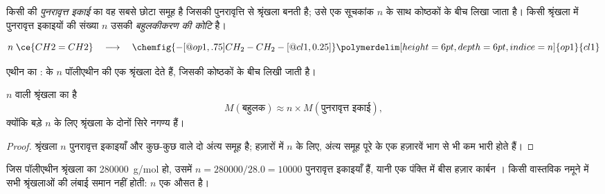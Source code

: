 \begin{definition}[पुनरावृत्त इकाई, बहुलकीकरण की कोटि]\label{def:g12:polymers:repeat-unit}
किसी  की \emph{पुनरावृत्त इकाई}  का वह सबसे छोटा
समूह है जिसकी पुनरावृत्ति से श्रृंखला बनती है; उसे एक सूचकांक $n$ के साथ
कोष्ठकों के बीच लिखा जाता है। किसी श्रृंखला में पुनरावृत्त इकाइयों की संख्या $n$
उसकी \emph{बहुलकीकरण की कोटि} है।
\end{definition}

\begin{omfigure}
\[
  n\;\ce{CH2=CH2}
  \quad\longrightarrow\quad
  \chemfig{-[@{op1,.75}]CH_2-CH_2-[@{cl1,0.25}]}
  \polymerdelim[height=6pt, depth=6pt, indice=n]{op1}{cl1}
\]

{\small एथीन का :  के $n$  पॉलीएथीन की एक
श्रृंखला देते हैं, जिसकी   कोष्ठकों के बीच
लिखी जाती है।}
\end{omfigure}

\begin{proposition}[बहुलक का मोलर द्रव्यमान]\label{prop:g12:polymers:molar-mass}
 $n$ वाली श्रृंखला का  है
\[
  M(\text{बहुलक}) \approx n \times M(\text{पुनरावृत्त इकाई}) ,
\]
क्योंकि बड़े $n$ के लिए श्रृंखला के दोनों सिरे नगण्य हैं।
\end{proposition}

\begin{proof}
श्रृंखला $n$ पुनरावृत्त इकाइयाँ और कुछ-कुछ  वाले दो अंत्य समूह है;
हज़ारों में $n$ के लिए, अंत्य समूह पूरे के एक हज़ारवें भाग से भी
कम भारी होते हैं।
\end{proof}

\begin{example}[एक पॉलीएथीन श्रृंखला]\label{ex:g12:polymers:pe}
जिस पॉलीएथीन श्रृंखला का  \qty{280000}{g/mol} हो, उसमें
$n = 280000/28.0 = 10000$ पुनरावृत्त इकाइयाँ हैं, यानी एक पंक्ति में बीस हज़ार कार्बन ।
किसी वास्तविक नमूने में सभी श्रृंखलाओं की लंबाई समान नहीं होती:
$n$ एक औसत है।
\end{example}

